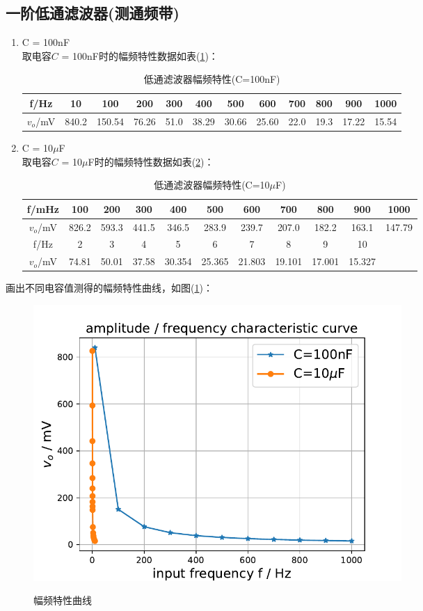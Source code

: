 \documentclass[a4paper]{article}
\begin{document}
\subsection{一阶低通滤波器(测通频带)}
\begin{enumerate}
\item C = 100nF\\
取电容$C$ = 100nF时的幅频特性数据如表(\ref{AFC1})：
\begin{table}[!h]
\centering
\caption{低通滤波器幅频特性(C=100nF)}
\label{AFC1}
\begin{tabular}{|c|c|c|c|c|c|c|c|c|c|c|c|}
\hline
f/Hz & 10 & 100 & 200 & 300 & 400 & 500 & 600 & 700 & 800 & 900 & 1000\\ \hline
$v_o$/mV & 840.2 & 150.54 & 76.26 & 51.0 & 38.29 & 30.66 & 25.60 & 22.0 & 19.3 & 17.22 & 15.54\\ \hline
\end{tabular}
\end{table}
\item C = 10$\mu$F\\
取电容$C$ = 10$\mu$F时的幅频特性数据如表(\ref{AFC2})：
\begin{table}[!h]
\centering
\caption{低通滤波器幅频特性(C=10$\mu$F)}
\label{AFC2}
\begin{tabular}{|c|c|c|c|c|c|c|c|c|c|c|}
\hline
f/mHz & 100 & 200 & 300 & 400 & 500 & 600 & 700 & 800 & 900 & 1000\\ \hline
$v_o$/mV & 826.2 & 593.3 & 441.5 & 346.5 & 283.9 & 239.7 & 207.0 & 182.2 & 163.1 & 147.79\\ \hline
f/Hz & 2 & 3 & 4 & 5 & 6 & 7 & 8 & 9 & 10 & \\ \hline
$v_o$/mV & 74.81 & 50.01 & 37.58 & 30.354 & 25.365 & 21.803 & 19.101 & 17.001 & 15.327 & \\ \hline
\end{tabular}
\end{table}
\end{enumerate}
画出不同电容值测得的幅频特性曲线，如图(\ref{AFC_lin})：
\begin{figure}[!h]
\centering
\includegraphics[width=14cm]{fig/AFC_lin.pdf}\\
\caption{幅频特性曲线}\label{AFC_lin}
\end{figure}
\end{document}
